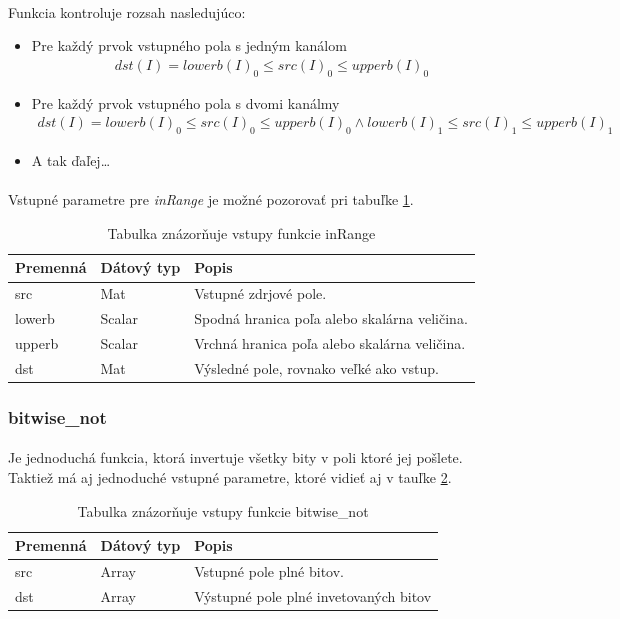 \documentclass[12pt]{article}
\begin{document}
\paragraph{}
Funkcia kontroluje rozsah nasledujúco:
\begin{itemize}
  \item Pre každý prvok vstupného pola s jedným kanálom
	\begin{align*}
	dst(I) = lowerb(I)_0 \le src(I)_0 \le upperb(I)_0
	\end{align*}
  \item Pre každý prvok vstupného pola s dvomi kanálmy
  	\begin{align*}
	dst(I) = lowerb(I)_0 \le src(I)_0 \le upperb(I)_0 \wedge lowerb(I)_1 \le src(I)_1 \le upperb(I)_1
	\end{align*}
  \item A tak ďaľej\ldots
\end{itemize}
\paragraph{}
Vstupné parametre pre \emph{inRange} je možné pozorovať pri tabuľke \ref{inRangePar}. 
\cite{OpenCVDoc}
\begin{table}
	\centering
    \begin{tabular}{ | l | l | p{5cm} |}
    \hline
    Premenná & Dátový typ & Popis \\ \hline
    src & Mat & Vstupné zdrjové pole. \\ \hline
    lowerb & Scalar & Spodná hranica poľa alebo skalárna veličina. \\ \hline
    upperb & Scalar & Vrchná hranica poľa alebo skalárna veličina. \\ \hline
    dst & Mat & Výsledné pole, rovnako veľké ako vstup. \\
    \hline
    \end{tabular}
  	\caption{Tabulka znázorňuje vstupy funkcie inRange}
  	\label{inRangePar}
\end{table}
\subsubsection{bitwise\_not}
\paragraph{}
Je jednoduchá funkcia, ktorá invertuje všetky bity v poli ktoré jej pošlete. Taktiež má aj jednoduché vstupné parametre, ktoré vidieť aj v tauľke \ref{bitwisePar}.
\cite{OpenCVDoc}
\begin{table}
	\centering
    \begin{tabular}{ | l | l | p{5cm} |}
    \hline
    Premenná & Dátový typ & Popis \\ \hline
    src & Array & Vstupné pole plné bitov. \\ \hline
    dst & Array & Výstupné pole plné invetovaných bitov \\
    \hline
    \end{tabular}
  	\caption{Tabulka znázorňuje vstupy funkcie bitwise\_not}
  	\label{bitwisePar}
\end{table}
\end{document}
